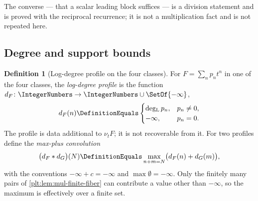 \documentclass[11pt,oneside]{article}
\theoremstyle{plain}
\theoremstyle{definition}
\newtheorem{definition}[theorem]{Definition}
\theoremstyle{remark}
\newcommand{\K}{\mathbb{K}}
\newcommand{\PLlau}{\PolynomialLogLaurentRing{\K}}       %
\newcommand{\ordt}{\nu_{t}}                              %
\DeclareMathOperator{\degL}{deg_{L}}
\newcommand{\dprofile}[1]{d_{#1}}                        %
\begin{document}
The converse --- that a scalar leading block suffices --- is a division
statement and is proved with the reciprocal recurrence; it is not a
multiplication fact and is not repeated here.

\subsection{Degree and support bounds}
\label{plt:sec:mul-degree}

\begin{definition}[Log-degree profile on the four classes]
\label{plt:def:mul-profile}
For $F=\sum_np_nt^n$ in one of the four classes, the \emph{log-degree
profile} is the function $\dprofile{F}\colon\IntegerNumbers\to
\IntegerNumbers\cup\SetOf{-\infty}$,
\begin{equation}\label{plt:eq:mul-profile}
 \dprofile{F}(n)\DefinitionEquals
 \begin{cases}
  \degL p_n,&p_n\ne0,\\
  -\infty,&p_n=0.
 \end{cases}
\end{equation}
The profile is data additional to $\ordt F$; it is not recoverable from it.
For two profiles define the \emph{max-plus convolution}
\begin{equation}\label{plt:eq:mul-maxplus}
 \bigl(\dprofile{F}\ast\dprofile{G}\bigr)(N)
 \DefinitionEquals
 \max_{n+m=N}\bigl(\dprofile{F}(n)+\dprofile{G}(m)\bigr),
\end{equation}
with the conventions $-\infty+c=-\infty$ and $\max\emptyset=-\infty$.  Only
the finitely many pairs of \cref{plt:lem:mul-finite-fiber} can contribute a
value other than $-\infty$, so the maximum is effectively over a finite set.
\end{definition}
\end{document}
